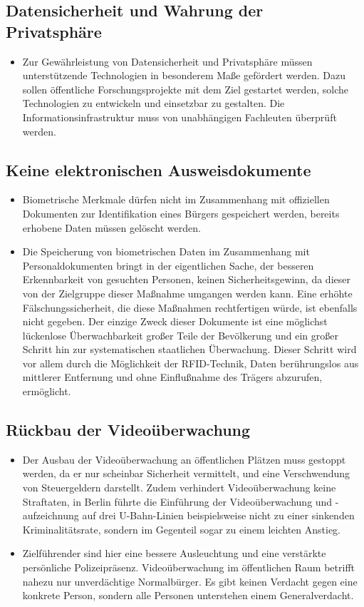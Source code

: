 \documentclass[10pt,a4paper,twocolumn,twoside,titlepage]{article}
\begin{document}
\subsection{Datensicherheit und Wahrung der Privatsphäre}
\begin{itemize}
\item Zur Gewährleistung von Datensicherheit und Privatsphäre müssen unterstützende Technologien in besonderem Maße gefördert werden. Dazu sollen öffentliche Forschungsprojekte mit dem Ziel gestartet werden, solche Technologien zu entwickeln und einsetzbar zu gestalten. Die Informationsinfrastruktur muss von unabhängigen Fachleuten überprüft werden.
\end{itemize}

\subsection{Keine elektronischen Ausweisdokumente}
\begin{itemize}
\item Biometrische Merkmale dürfen nicht im Zusammenhang mit offiziellen Dokumenten zur Identifikation eines Bürgers gespeichert werden, bereits erhobene Daten müssen gelöscht werden.
\item Die Speicherung von biometrischen Daten im Zusammenhang mit Personaldokumenten bringt in der eigentlichen Sache, der besseren Erkennbarkeit von gesuchten Personen, keinen Sicherheitsgewinn, da dieser von der Zielgruppe dieser Maßnahme umgangen werden kann. Eine erhöhte Fälschungssicherheit, die diese Maßnahmen rechtfertigen würde, ist ebenfalls nicht gegeben. Der einzige Zweck dieser Dokumente ist eine möglichst lückenlose Überwachbarkeit großer Teile der Bevölkerung und ein großer Schritt hin zur systematischen staatlichen Überwachung. Dieser Schritt wird vor allem durch die Möglichkeit der RFID-Technik, Daten berührungslos aus mittlerer Entfernung und ohne Einflußnahme des Trägers abzurufen, ermöglicht.
\end{itemize}

\subsection{Rückbau der Videoüberwachung}
\begin{itemize}
\item Der Ausbau der Videoüberwachung an öffentlichen Plätzen muss gestoppt werden, da er nur scheinbar Sicherheit vermittelt, und eine Verschwendung von Steuergeldern darstellt. Zudem verhindert Videoüberwachung keine Straftaten, in Berlin führte die Einführung der Videoüberwachung und -aufzeichnung auf drei U-Bahn-Linien beispielsweise nicht zu einer sinkenden Kriminalitätsrate, sondern im Gegenteil sogar zu einem leichten Anstieg.
\item Zielführender sind hier eine bessere Ausleuchtung und eine verstärkte persönliche Polizeipräsenz. Videoüberwachung im öffentlichen Raum betrifft nahezu nur unverdächtige Normalbürger. Es gibt keinen Verdacht gegen eine konkrete Person, sondern alle Personen unterstehen einem Generalverdacht.
\end{itemize}
\end{document}
